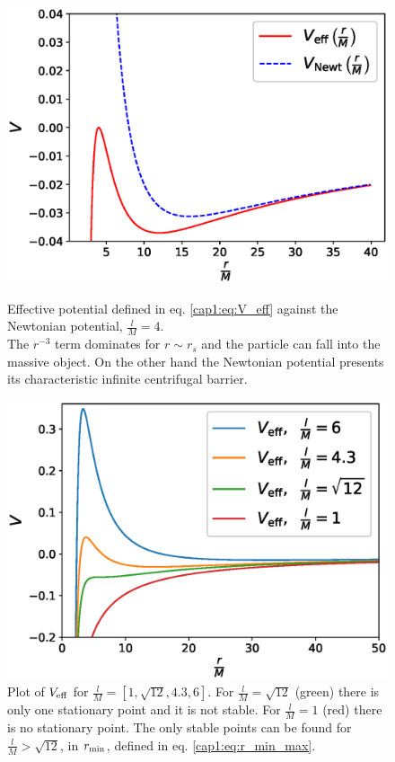 \begin{figure}[h]
\begin{minipage}{0.49 \textwidth}
    \centering
    \includegraphics[width = \textwidth]{Figures/V_eff.eps}
    \caption{Effective potential defined in eq. \ref{cap1:eq:V_eff} against the
    Newtonian potential, $\frac{l}{M} = 4$. \\
    The $r^{-3}$ term dominates for $r \sim r_s$ and the
    particle can fall into the massive object.
    On the other hand the Newtonian potential presents its characteristic
    infinite centrifugal barrier.}
    \label{cap1:fig:V_effvsVN}
\end{minipage}
\hspace{0.009 \textwidth}
\begin{minipage}{0.49 \textwidth}
    \centering
    \includegraphics[width = \textwidth]{Figures/V_eff_tanti.eps}
    \caption{Plot of $V_{\rm eff}$ for $\frac{l}{M} = [1, \sqrt{12}, 4.3, 6]$.
    For $\frac{l}{M} = \sqrt{12}$ (green) there is only one stationary point
    and it is not stable.
    For $\frac{l}{M} = 1$ (red) there is no stationary point.
    The only stable points can be found for $\frac{l}{M} > \sqrt{12}$,
    in $r_{\rm min}$, defined in eq. \ref{cap1:eq:r_min_max}.}
    \label{cap1:fig:V_eff_tanti}
\end{minipage}
\end{figure}

